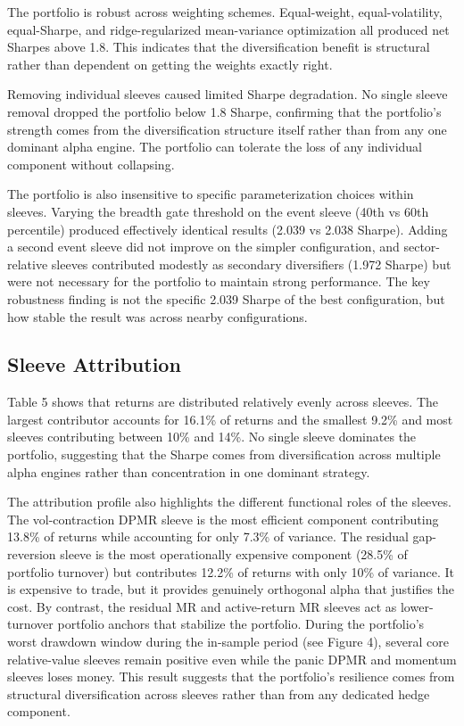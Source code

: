 \documentclass{article}
\begin{document}
The portfolio is robust across weighting schemes. Equal-weight, equal-volatility, equal-Sharpe, and ridge-regularized mean-variance optimization all produced net Sharpes above 1.8. This indicates that the diversification benefit is structural rather than dependent on getting the weights exactly right.

Removing individual sleeves caused limited Sharpe degradation. No single sleeve removal dropped the portfolio below 1.8 Sharpe, confirming that the portfolio's strength comes from the diversification structure itself rather than from any one dominant alpha engine. The portfolio can tolerate the loss of any individual component without collapsing.

The portfolio is also insensitive to specific parameterization choices within sleeves. Varying the breadth gate threshold on the event sleeve (40th vs 60th percentile) produced effectively identical results (2.039 vs 2.038 Sharpe). Adding a second event sleeve did not improve on the simpler configuration, and sector-relative sleeves contributed modestly as secondary diversifiers (1.972 Sharpe) but were not necessary for the portfolio to maintain strong performance. The key robustness finding is not the specific 2.039 Sharpe of the best configuration, but how stable the result was across nearby configurations.

\subsection{Sleeve Attribution}

Table 5 shows that returns are distributed relatively evenly across sleeves. The largest contributor accounts for 16.1\% of returns and the smallest 9.2\% and most sleeves contributing between 10\% and 14\%. No single sleeve dominates the portfolio, suggesting that the Sharpe comes from diversification across multiple alpha engines rather than concentration in one dominant strategy.

The attribution profile also highlights the different functional roles of the sleeves. The vol-contraction DPMR sleeve is the most efficient component contributing 13.8\% of returns while accounting for only 7.3\% of variance. The residual gap-reversion sleeve is the most operationally expensive component (28.5\% of portfolio turnover) but contributes 12.2\% of returns with only 10\% of variance. It is expensive to trade, but it provides genuinely orthogonal alpha that justifies the cost. By contrast, the residual MR and active-return MR sleeves act as lower-turnover portfolio anchors that stabilize the portfolio. During the portfolio’s worst drawdown window during the in-sample period (see Figure 4), several core relative-value sleeves remain positive even while the panic DPMR and momentum sleeves loses money. This result suggests that the portfolio’s resilience comes from structural diversification across sleeves rather than from any dedicated hedge component.
\end{document}

